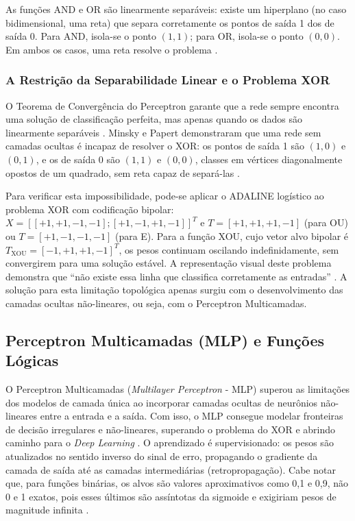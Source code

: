As funções AND e OR são linearmente separáveis: existe um hiperplano (no caso bidimensional, uma reta) que separa corretamente os pontos de saída 1 dos de saída 0. Para AND, isola-se o ponto $(1,1)$; para OR, isola-se o ponto $(0,0)$. Em ambos os casos, uma reta resolve o problema \cite{rand2006}.

\subsubsection{A Restrição da Separabilidade Linear e o Problema XOR}

O Teorema de Convergência do Perceptron garante que a rede sempre encontra uma solução de classificação perfeita, mas apenas quando os dados são linearmente separáveis \cite{braga2007}. Minsky e Papert demonstraram que uma rede sem camadas ocultas é incapaz de resolver o XOR: os pontos de saída 1 são $(1,0)$ e $(0,1)$, e os de saída 0 são $(1,1)$ e $(0,0)$, classes em vértices diagonalmente opostos de um quadrado, sem reta capaz de separá-las \cite{abdi2006}.

Para verificar esta impossibilidade, pode-se aplicar o ADALINE logístico ao problema XOR com codificação bipolar: $X = [[+1,+1,-1,-1]; [+1,-1,+1,-1]]^T$ e $T = [+1,+1,+1,-1]$ (para OU) ou $T = [+1,-1,-1,-1]$ (para E). Para a função XOU, cujo vetor alvo bipolar é $T_{\text{XOU}} = [-1,+1,+1,-1]^T$, os pesos continuam oscilando indefinidamente, sem convergirem para uma solução estável. A representação visual deste problema demonstra que ``não existe essa linha que classifica corretamente as entradas'' \cite{rand2006}. A solução para esta limitação topológica apenas surgiu com o desenvolvimento das camadas ocultas não-lineares, ou seja, com o Perceptron Multicamadas.

\subsection{Perceptron Multicamadas (MLP) e Funções Lógicas}

O Perceptron Multicamadas (\textit{Multilayer Perceptron} - MLP) superou as limitações dos modelos de camada única ao incorporar camadas ocultas de neurônios não-lineares entre a entrada e a saída. Com isso, o MLP consegue modelar fronteiras de decisão irregulares e não-lineares, superando o problema do XOR e abrindo caminho para o \textit{Deep Learning} \cite{silva2016}. O aprendizado é supervisionado: os pesos são atualizados no sentido inverso do sinal de erro, propagando o gradiente da camada de saída até as camadas intermediárias (retropropagação). Cabe notar que, para funções binárias, os alvos são valores aproximativos como 0,1 e 0,9, não 0 e 1 exatos, pois esses últimos são assíntotas da sigmoide e exigiriam pesos de magnitude infinita \cite{braga2007}.

